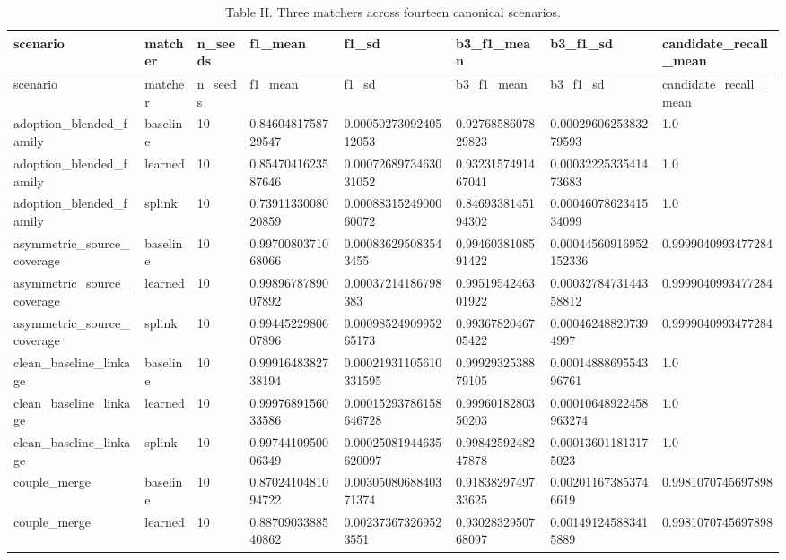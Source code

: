 \begin{longtable}{llllllll}
\caption{Table II. Three matchers across fourteen canonical scenarios.}\\
\toprule
scenario & matcher & n\_seeds & f1\_mean & f1\_sd & b3\_f1\_mean & b3\_f1\_sd & candidate\_recall\_mean \\
\midrule
\endfirsthead
\toprule
scenario & matcher & n\_seeds & f1\_mean & f1\_sd & b3\_f1\_mean & b3\_f1\_sd & candidate\_recall\_mean \\
\midrule
\endhead
adoption\_blended\_family & baseline & 10 & 0.8460481758729547 & 0.0005027309240512053 & 0.9276858607829823 & 0.0002960625383279593 & 1.0 \\
adoption\_blended\_family & learned & 10 & 0.8547041623587646 & 0.0007268973463031052 & 0.9323157491467041 & 0.0003222533541473683 & 1.0 \\
adoption\_blended\_family & splink & 10 & 0.7391133008020859 & 0.0008831524900060072 & 0.8469338145194302 & 0.0004607862341534099 & 1.0 \\
asymmetric\_source\_coverage & baseline & 10 & 0.9970080371068066 & 0.000836295083543455 & 0.9946038108591422 & 0.00044560916952152336 & 0.9999040993477284 \\
asymmetric\_source\_coverage & learned & 10 & 0.9989678789007892 & 0.00037214186798383 & 0.9951954246301922 & 0.0003278473144358812 & 0.9999040993477284 \\
asymmetric\_source\_coverage & splink & 10 & 0.9944522980607896 & 0.0009852490995265173 & 0.9936782046705422 & 0.000462488207394997 & 0.9999040993477284 \\
clean\_baseline\_linkage & baseline & 10 & 0.9991648382738194 & 0.00021931105610331595 & 0.9992932538879105 & 0.0001488869554396761 & 1.0 \\
clean\_baseline\_linkage & learned & 10 & 0.9997689156033586 & 0.00015293786158646728 & 0.9996018280350203 & 0.00010648922458963274 & 1.0 \\
clean\_baseline\_linkage & splink & 10 & 0.9974410950006349 & 0.00025081944635620097 & 0.9984259248247878 & 0.000136011813175023 & 1.0 \\
couple\_merge & baseline & 10 & 0.8702410481094722 & 0.0030508068840371374 & 0.9183829749733625 & 0.002011673853746619 & 0.9981070745697898 \\
couple\_merge & learned & 10 & 0.8870903388540862 & 0.002373673269523551 & 0.9302832950768097 & 0.001491245883415889 & 0.9981070745697898 \\

\end{longtable}
